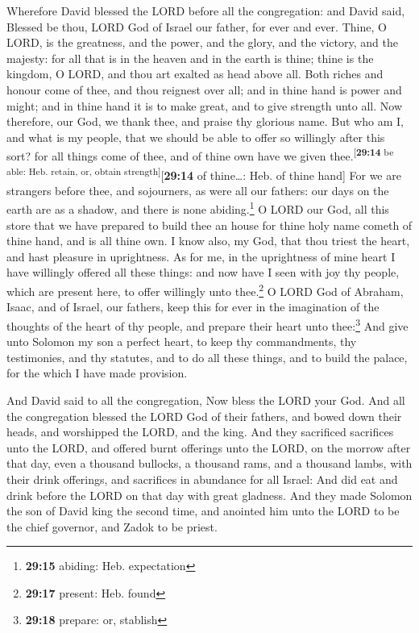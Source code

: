  Wherefore David blessed the LORD before all the
congregation: and David said, Blessed be thou, LORD God of Israel our
father, for ever and ever.  Thine, O LORD, is the
greatness, and the power, and the glory, and the victory, and the
majesty: for all that is in the heaven and in the earth is thine; thine
is the kingdom, O LORD, and thou art exalted as head above all.
 Both riches and honour come of thee, and thou reignest
over all; and in thine hand is power and might; and in thine hand it is
to make great, and to give strength unto all.  Now
therefore, our God, we thank thee, and praise thy glorious name.
 But who am I, and what is my people, that we should be
able to offer so willingly after this sort? for all things come of thee,
and of thine own have we given thee.\textsuperscript{{[}\textbf{29:14}
be able: Heb. retain, or, obtain strength{]}}{[}\textbf{29:14} of
thine\ldots: Heb. of thine hand{]}  For we are strangers
before thee, and sojourners, as were all our fathers: our days on the
earth are as a shadow, and there is none abiding.\footnote{\textbf{29:15}
  abiding: Heb. expectation}  O LORD our God, all this
store that we have prepared to build thee an house for thine holy name
cometh of thine hand, and is all thine own.  I know also,
my God, that thou triest the heart, and hast pleasure in uprightness. As
for me, in the uprightness of mine heart I have willingly offered all
these things: and now have I seen with joy thy people, which are present
here, to offer willingly unto thee.\footnote{\textbf{29:17} present:
  Heb. found}  O LORD God of Abraham, Isaac, and of
Israel, our fathers, keep this for ever in the imagination of the
thoughts of the heart of thy people, and prepare their heart unto
thee:\footnote{\textbf{29:18} prepare: or, stablish}  And
give unto Solomon my son a perfect heart, to keep thy commandments, thy
testimonies, and thy statutes, and to do all these things, and to build
the palace, for the which I have made provision.

 And David said to all the congregation, Now bless the
LORD your God. And all the congregation blessed the LORD God of their
fathers, and bowed down their heads, and worshipped the LORD, and the
king.  And they sacrificed sacrifices unto the LORD, and
offered burnt offerings unto the LORD, on the morrow after that day,
even a thousand bullocks, a thousand rams, and a thousand lambs, with
their drink offerings, and sacrifices in abundance for all Israel:
 And did eat and drink before the LORD on that day with
great gladness. And they made Solomon the son of David king the second
time, and anointed him unto the LORD to be the chief governor, and Zadok
to be priest.

